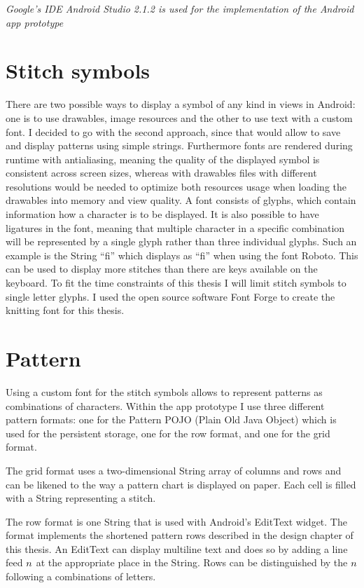 \textit{Google’s IDE Android Studio 2.1.2 is used for the implementation of the Android app prototype}

\section{Stitch symbols}
There are two possible ways to display a symbol of any kind in views in Android: one is to use drawables, image resources and the other to use text with a custom font. I decided to go with the second approach, since that would allow to save and display patterns using simple strings. Furthermore fonts are rendered during runtime with antialiasing, meaning the quality of the displayed symbol is consistent across screen sizes, whereas with drawables files with different resolutions would be needed to optimize both resources usage when loading the drawables into memory and view quality.
A font consists of glyphs, which contain information how a character is to be displayed. It is also possible to have ligatures in the font, meaning that multiple character in a specific combination will be represented by a single glyph rather than three individual glyphs. Such an example is the String “fi” which displays as “fi” when using the font Roboto. This can be used to display more stitches than there are keys available on the keyboard. To fit the time constraints of this thesis I will limit stitch symbols to single letter glyphs.
I used the open source software Font Forge to create the knitting font for this thesis.

\section{Pattern}
Using a custom font for the stitch symbols allows to represent patterns as combinations of characters. Within the app prototype I use three different pattern formats: one for the Pattern POJO (Plain Old Java Object) which is used for the persistent storage, one for the row format, and one for the grid format.

The grid format uses a two-dimensional String array of columns and rows and can  be likened to the way a pattern chart is displayed on paper. Each cell is filled with a String representing a stitch.

The row format is one String that is used with Android’s EditText widget. The format implements the shortened pattern rows described in the design chapter of this thesis. An EditText can display multiline text and does so by adding a line feed $\\n$ at the appropriate place in the String. Rows can be distinguished by the $\\n$ following a combinations of letters.

